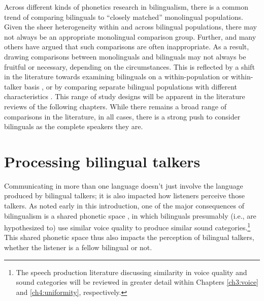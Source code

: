 Across different kinds of phonetics research in bilingualism, there is a common trend of comparing bilinguals to ``closely matched'' monolingual populations. Given the sheer heterogeneity within and across bilingual populations, there may not always be an appropriate monolingual comparison group. Further, \citet{grosjean_1989_bilingual} and many others have argued that such comparisons are often inappropriate. As a result, drawing comparisons between monolinguals and bilinguals may not always be fruitful or necessary, depending on the circumstances. This is reflected by a shift in the literature towards examining bilinguals on a within-population \citep[e.g.,][]{chan_2020_lexically} or within-talker basis \citep[e.g.,][]{simonet_2019_convergence}, or by comparing separate bilingual populations with different characteristics \citep[e.g.,][]{brown_2009_phonological}. This range of study designs will be apparent in the literature reviews of the following chapters. While there remains a broad range of comparisons in the literature, in all cases, there is a strong push to consider bilinguals as the complete speakers they are.

\section{Processing bilingual talkers}\label{ch1:sec:processing}

Communicating in more than one language doesn't just involve the language produced by bilingual talkers; it is also impacted how listeners perceive those talkers. As noted early in this introduction, one of the major consequences of bilingualism is a shared phonetic space \citep{flege_2021_slmr}, in which bilinguals presumably (i.e., are hypothesized to) use similar voice quality to produce similar sound categories.\footnote{The speech production literature discussing similarity in voice quality and sound categories will be reviewed in greater detail within Chapters \ref{ch3:voice} and \ref{ch4:uniformity}, respectively.} This shared phonetic space thus also impacts the perception of bilingual talkers, whether the listener is a fellow bilingual or not.

